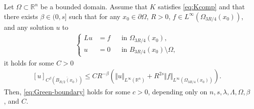 \documentclass[10pt,a4paper]{amsart}
\newcommand{\R}{\mathbb{R}}
\begin{document}
\begin{lemma}
\label{lemma:comp-princ}
Let $\Omega \subset \R^n$ be a bounded domain. Assume that $K$ satisfies \eqref{eq:Kcomp} and that there exists $\beta \in (0,s]$ such that for any $x_0 \in \partial \Omega$, $R > 0$, $f \in L^{\infty}(\Omega_{3R/4}(x_0))$, and any solution $u$ to 
\begin{align*}
\left\{
\begin{aligned}
L u &= f &&\text{in } \Omega_{3R/4}(x_0),\\
u &= 0 &&\text{in } B_{3R/4}(x_0) \setminus \Omega,
\end{aligned}
\right.
\end{align*}
it holds for some $C > 0$
\begin{align}
\label{eq:u-reg-assumption}
    [ u ]_{C^{\beta}(\overline{B_{R/2}(x_0)})} \le C R^{-\beta} \left( \Vert u \Vert_{L^{\infty}(\R^n)} + R^{2s} \Vert f \Vert_{L^{\infty}(\Omega_{3R/4}(x_0))} \right).
\end{align}
Then, \eqref{eq:Green-boundary} holds for some $c > 0$, depending only on $n,s,\lambda,\Lambda,\Omega,\beta$, and $C$.
\end{lemma}
\end{document}
